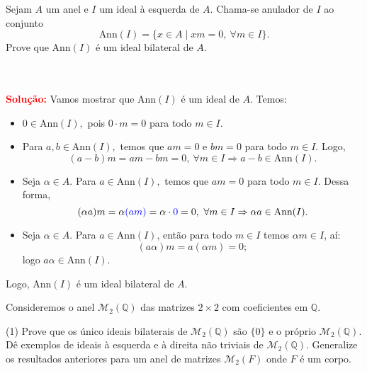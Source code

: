 \documentclass[11pt,a4paper]{article}
\newcounter{exercicio}[section]
\newcommand{\dividiritens}[1]{\begin{tasks}[counter-format={(tsk[a])},label-width=3.6ex, label-format = {\bfseries}, column-sep = {0pt}](1) #1 \end{tasks}}
\newcommand{\pers}[1]{\textcolor{Floresta}{$\negrito{(#1)} $}}
\newcommand{\solucao}[1]{
\textbf{\textcolor{white}{oi}\\ \\ \textcolor{red}{Solução:}} #1}
\begin{document}
 Sejam $A$ um anel e $I$ um ideal à esquerda de $A.$ Chama-se anulador de $I$ ao conjunto \[
\mbox{Ann}(I) = \{x \in
A \mid xm = 0, \ \forall m \in I \}.\] Prove que $\mbox{Ann}(I)$ é um ideal bilateral de $A.$
\solucao{Vamos mostrar que $\mbox{Ann}(I)$ é um ideal de $A.$ Temos:
\begin{itemize}
\item $0 \in \mbox{Ann}(I),$ pois $0 \cdot m = 0$ para todo $m \in I.$
\item Para $a,b \in \mbox{Ann}(I),$ temos que $am = 0$ e $bm = 0$ para todo $m \in I.$ Logo,
\[
(a-b)m = am - bm = 0, \ \forall m \in I \Rightarrow a-b \in \mbox{Ann}(I).
\]
\item Seja $\alpha \in A.$ Para $a \in \mbox{Ann}(I),$ temos que $am = 0$ para todo $m \in I.$ Dessa forma,
\[
(\alpha a)m = \alpha \textcolor{blue}{(am)} = \alpha \cdot \textcolor{blue}{0}=0, \ \forall m\in I \Rightarrow \alpha a \in \mbox{Ann}(I).
\]
\item Seja $\alpha\in A$. Para $a\in \mbox{Ann}(I)$, então para todo $m\in I$ temos $\alpha m\in I$, aí:
\[
(a\alpha)m=a(\alpha m)=0;
\]
logo $a\alpha\in \mbox{Ann}(I)$.
\end{itemize}
Logo, $\mbox{Ann}(I)$ é um ideal bilateral de $A.$
}
 Consideremos o anel $\mathcal{M}_2(\mathbb{Q})$ das matrizes $2 \times 2$ com coeficientes em $\mathbb{Q}.$
\dividiritens{
\task[\pers{a}] Prove que os único ideais bilaterais de $\mathcal{M}_2(\mathbb{Q})$ são $\{ 0\}$ e o próprio $\mathcal{M}_2(\mathbb{Q})$.
\task[\pers{b}] Dê exemplos de ideais à esquerda e à direita não triviais de $\mathcal{M}_2(\mathbb{Q})$.
\task[\pers{c}]  Generalize os resultados anteriores para um anel de matrizes $\mathcal{M}_2(F)$ onde $F$ é um corpo.
}
\end{document}
